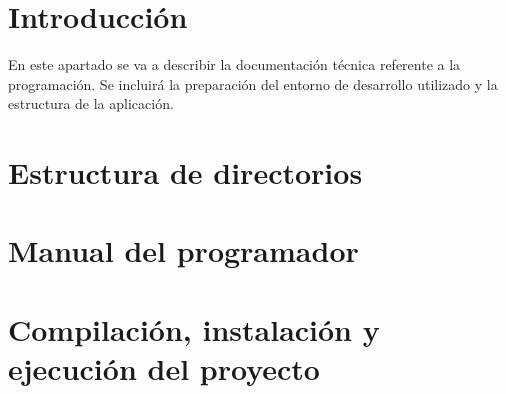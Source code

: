 
\section{Introducción}

En este apartado se va a describir la documentación técnica referente a la programación. Se incluirá la preparación del entorno de desarrollo utilizado y la estructura de la aplicación.

\section{Estructura de directorios}

\section{Manual del programador}

\section{Compilación, instalación y ejecución del proyecto}

